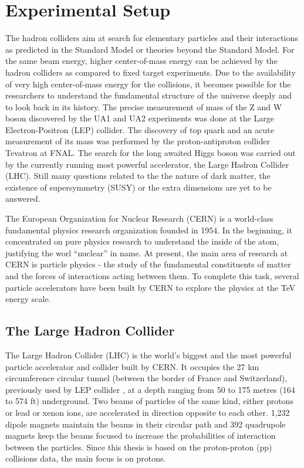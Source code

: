 \chapter{Experimental Setup}
\label{chap:Detector}
The hadron colliders aim at search for elementary particles and their interactions as predicted in the Standard Model or theories beyond the Standard Model. For the same beam energy, higher center-of-mass energy can be achieved by the hadron colliders as compared to fixed target experiments. Due to the availability of very high center-of-mass energy for the collisions, it becomes possible for the researchers to understand the fundamental structure of the universe deeply and to look back in its history. The precise measurement of mass of the Z and W boson discovered by the UA1 and UA2 experiments was done at the Large Electron-Positron (LEP) collider. The discovery of top quark and an acute measurement of its mass was performed by the proton-antiproton collider Tevatron at FNAL. The search for the long awaited Higgs boson was carried out by the currently running most powerful accelerator, the Large Hadron Collider (LHC). Still many questions related to the the nature of dark matter, the existence of supersymmetry (SUSY) or the extra dimensions are yet to be answered. 

The European Organization for Nuclear Research (CERN) is a world-class fundamental physics research organization founded in 1954. In the beginning, it concentrated on pure physics research to understand the inside of the atom, justifying the worl ``nuclear'' in name. At present, the main area of research at CERN is particle physics - the study of the fundamental constituents of matter and the forces of interactions acting between them. To complete this task, several particle accelerators have been built by CERN to explore the physics at the TeV energy scale.

\section{The Large Hadron Collider}
The Large Hadron Collider (LHC) \cite{Evans:2008zzb} is the world's biggest and the most powerful particle accelerator and collider built by CERN. It occupies the 27 km circumference circular tunnel (between the border of France and Switzerland), previously used by LEP collider \cite{LEP}, at a depth ranging from 50 to 175 metres (164 to 574 ft) underground. Two beams of particles of the same kind, either protons or lead or xenon ions, are accelerated in direction opposite to each other. 1,232 dipole magnets maintain the beams in their circular path and 392 quadrupole magnets keep the beams focused to increase the probabilities of interaction between the particles. Since this thesis is based on the proton-proton (pp) collisions data, the main focus is on protons. 

